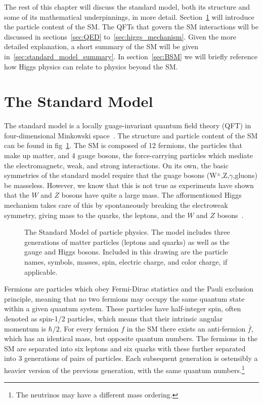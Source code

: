 The rest of this chapter will discuss the standard model, both its structure and some of its mathematical underpinnings, in more detail.
Section~\ref{sec:standard_model} will introduce the particle content of the SM.
The QFTs that govern the SM interactions will be discussed in sections~\ref{sec:QED} to~\ref{sec:higgs_mechanism}.
Given the more detailed explanation, a short summary of the SM will be given in~\ref{sec:standard_model_summary}.
In section~\ref{sec:BSM} we will briefly reference how Higgs physics can relate to physics beyond the SM.

\section{The Standard Model}
\label{sec:standard_model}

The standard model is a locally guage-invariant quantum field theory (QFT) in four-dimensional Minkowski space~\cite{Burgess2007,Barnes2010}.
The structure and particle content of the SM can be found in fig~\ref{fig:standard_model}.
The SM is composed of 12 fermions, the particles that make up matter, and 4 gauge bosons, the force-carrying particles which mediate the electromagnetc, weak, and strong interactions.
On its own, the basic symmetries of the standard model require that the guage bosons (W$^\pm$,Z,$\gamma$,gluons) be masseless.
However, we know that this is not true as experiments have shown that the $W$ and $Z$ bosons have quite a large mass.
The afformentioned Higgs mechanism takes care of this by spontaneously breaking the electroweak symmetry, giving mass to the quarks, the leptons, and the $W$ and $Z$ bosons~\cite{PhysRevLett.19.1264,salam1968,Dawson:1998yi}.

\begin{figure}[!hbt]
	\centering
	\resizebox{0.95\textwidth}{!}{}
	\caption{The Standard Model of particle physics. The model includes three generations of matter particles (leptons and quarks) as well as the gauge and Higgs bosons. Included in this drawing are the particle names, symbols, masses, spin, electric charge, and color charge, if applicable.}
	\label{fig:standard_model}
\end{figure}

Fermions are particles which obey Fermi-Dirac statistics and the Pauli exclusion principle, meaning that no two fermions may occupy the same quantum state within a given quantum system.
These particles have half-integer spin, often denoted as spin-1/2 particles, which means that their intrinsic angular momentum is $\hbar/2$.
For every fermion $f$ in the SM there exists an anti-fermion $\bar{f}$, which has an identical mass, but opposite quantum numbers.
The fermions in the SM are separated into six leptons and six quarks with these further separated into 3 generations of pairs of particles.
Each subsequent generation is ostensibly a heavier version of the previous generation, with the same quantum numbers.\footnote{The neutrinos may have a different mass ordering.}

